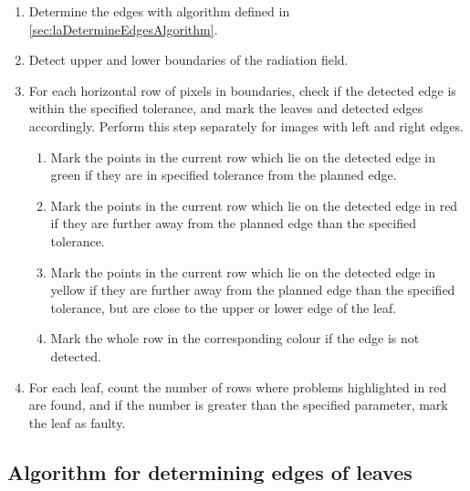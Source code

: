 \begin{enumerate}

    \item Determine the edges with algorithm defined in \autoref{sec:laDetermineEdgesAlgorithm}.

    \item Detect upper and lower boundaries of the radiation field.

    \item For each horizontal row of pixels in boundaries, check if the detected edge is within the specified tolerance, and mark the leaves and detected edges accordingly. Perform this step separately for images with left and right edges.

    \begin{enumerate}
        \item Mark the points in the current row which lie on the detected edge in green if they are in specified tolerance from the planned edge.
        \item Mark the points in the current row which lie on the detected edge in red if they are further away from the planned edge than the specified tolerance.
        \item Mark the points in the current row which lie on the detected edge in yellow if they are further away from the planned edge than the specified tolerance, but are close to the upper or lower edge of the leaf.
        \item Mark the whole row in the corresponding colour if the edge is not detected.
    \end{enumerate}

    \item For each leaf, count the number of rows where problems highlighted in red are found, and if the number is greater than the specified parameter, mark the leaf as faulty.
    
\end{enumerate}

\pagebreak

\subsection{Algorithm for determining edges of leaves} \label{sec:laDetermineEdgesAlgorithm}

